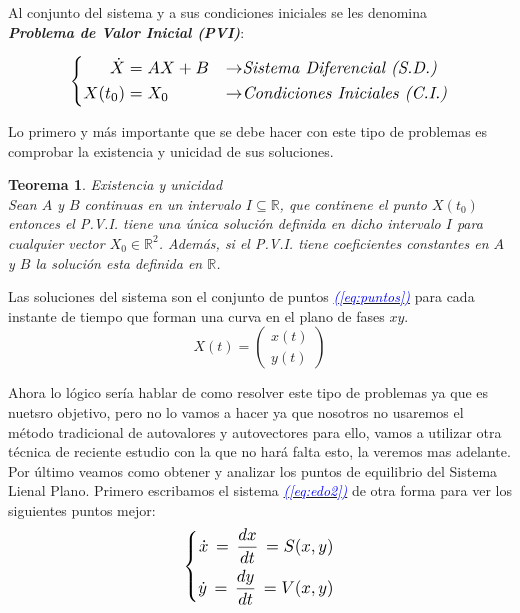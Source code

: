 \documentclass[12pt,a4paper]{report} %
\newtheorem{theorem}{Teorema}
\newcommand{\eref}[1]{\hyperref[#1]{\textcolor{blue}{\textit{(\ref*{#1})}}}}
\begin{document}
	Al conjunto del sistema y a sus condiciones iniciales se les denomina \\ \textbf{\textit{Problema de Valor Inicial (PVI)}}: 
	
	\begin{equation}
	\label{eq:pvi}
	\scalebox{1.2}{$\displaystyle
		\left\{
		\begin{aligned}
			\dot{X}&=AX+B &\rightarrow& \textit{Sistema Diferencial (S.D.)}\\
			X(t_0)&=X_0 &\rightarrow& \textit{Condiciones Iniciales (C.I.)}
		\end{aligned}
		\right.
		$}
    \end{equation}\smallskip
	
	Lo primero y más importante que se debe hacer con este tipo de problemas es comprobar la existencia y unicidad de sus soluciones.
	\newpage
	\begin{theorem}\label{thm:interesante}
		Existencia y unicidad \\[2mm]
		\textit{Sean $A$ y $B$ continuas en un intervalo $I\subseteq  \mathbb{R}$, que continene el punto $X(t_0)$ entonces el P.V.I. tiene una única solución definida en dicho intervalo $I$ para cualquier vector $X_0 \in \mathbb{R}^2$}. Además, si el P.V.I. tiene coeficientes constantes en $A$ y $B$ la solución esta definida en $\mathbb{R}$.
	\end{theorem}
	\vspace{4mm}
	
	Las soluciones del sistema son el conjunto de puntos \eref{eq:puntos} para cada instante de tiempo que forman una curva en el plano de fases $xy$.
	\begin{equation}
		\label{eq:puntos}
		X(t)=\begin{pmatrix}
			x(t) \\ y(t)
		\end{pmatrix}
	\end{equation}\smallskip
	
	Ahora lo lógico sería hablar de como resolver este tipo de problemas ya que es nuetsro objetivo, pero no lo vamos a hacer ya que nosotros no usaremos el método tradicional de autovalores y autovectores para ello, vamos a utilizar otra técnica de reciente estudio con la que no hará falta esto, la veremos mas adelante.\\[0.5cm]
	Por último veamos como obtener y analizar los puntos de equilibrio del Sistema Lienal Plano. Primero escribamos el sistema \eref{eq:edo2} de otra forma para ver los siguientes puntos mejor:
	\begin{equation}
		\label{eq:sv}
		\scalebox{1.2}{$\displaystyle
			\left\{
			\begin{aligned}
				\dot{x}\,=\,\frac{dx}{dt}\,=S(x,y) \\
				\dot{y}\,=\,\frac{dy}{dt}\,=V(x,y)
			\end{aligned}
			\right.
			$}
	\end{equation}\smallskip
	
\end{document}
